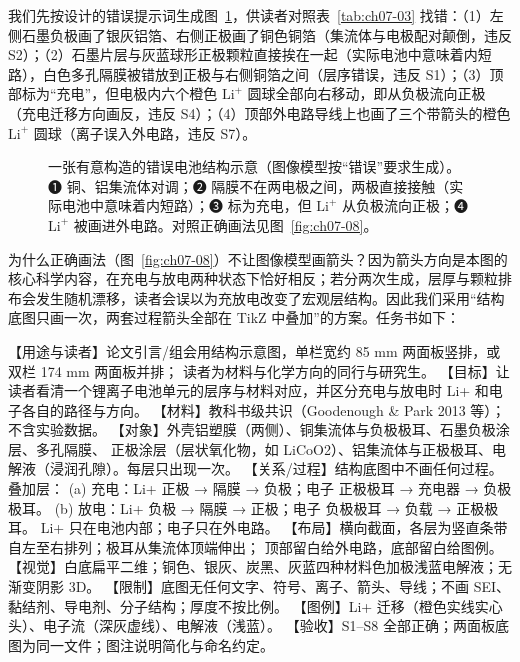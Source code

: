 我们先按设计的错误提示词生成图~\ref{fig:ch07-07}，供读者对照表~\ref{tab:ch07-03} 找错：（1）左侧石墨负极画了银灰铝箔、右侧正极画了铜色铜箔（集流体与电极配对颠倒，违反 S2）；（2）石墨片层与灰蓝球形正极颗粒直接挨在一起（实际电池中意味着内短路），白色多孔隔膜被错放到正极与右侧铜箔之间（层序错误，违反 S1）；（3）顶部标为“充电”，但电极内六个橙色 $\text{Li}^+$ 圆球全部向右移动，即从负极流向正极（充电迁移方向画反，违反 S4）；（4）顶部外电路导线上也画了三个带箭头的橙色 $\text{Li}^+$ 圆球（离子误入外电路，违反 S7）。

\begin{figure}[htbp]\centering

\caption{一张有意构造的错误电池结构示意（图像模型按“错误”要求生成）。❶ 铜、铝集流体对调；❷ 隔膜不在两电极之间，两极直接接触（实际电池中意味着内短路）；❸ 标为充电，但 $\text{Li}^+$ 从负极流向正极；❹ $\text{Li}^+$ 被画进外电路。对照正确画法见图~\ref{fig:ch07-08}。}\label{fig:ch07-07}
\end{figure}

为什么正确画法（图~\ref{fig:ch07-08}）不让图像模型画箭头？因为箭头方向是本图的核心科学内容，在充电与放电两种状态下恰好相反；若分两次生成，层厚与颗粒排布会发生随机漂移，读者会误以为充放电改变了宏观层结构。因此我们采用“结构底图只画一次，两套过程箭头全部在 TikZ 中叠加”的方案。任务书如下：

\begin{Prompt}
【用途与读者】论文引言/组会用结构示意图，单栏宽约 85 mm 两面板竖排，或双栏 174 mm 两面板并排；
读者为材料与化学方向的同行与研究生。
【目标】让读者看清一个锂离子电池单元的层序与材料对应，并区分充电与放电时 Li+ 和电子各自的路径与方向。
【材料】教科书级共识（Goodenough & Park 2013 等）；不含实验数据。
【对象】外壳铝塑膜（两侧）、铜集流体与负极极耳、石墨负极涂层、多孔隔膜、
正极涂层（层状氧化物，如 LiCoO2）、铝集流体与正极极耳、电解液（浸润孔隙）。每层只出现一次。
【关系/过程】结构底图中不画任何过程。叠加层：
(a) 充电：Li+ 正极 → 隔膜 → 负极；电子 正极极耳 → 充电器 → 负极极耳。
(b) 放电：Li+ 负极 → 隔膜 → 正极；电子 负极极耳 → 负载 → 正极极耳。
Li+ 只在电池内部；电子只在外电路。
【布局】横向截面，各层为竖直条带自左至右排列；极耳从集流体顶端伸出；
顶部留白给外电路，底部留白给图例。
【视觉】白底扁平二维；铜色、银灰、炭黑、灰蓝四种材料色加极浅蓝电解液；无渐变阴影 3D。
【限制】底图无任何文字、符号、离子、箭头、导线；不画 SEI、黏结剂、导电剂、分子结构；厚度不按比例。
【图例】Li+ 迁移（橙色实线实心头）、电子流（深灰虚线）、电解液（浅蓝）。
【验收】S1–S8 全部正确；两面板底图为同一文件；图注说明简化与命名约定。
\end{Prompt}


